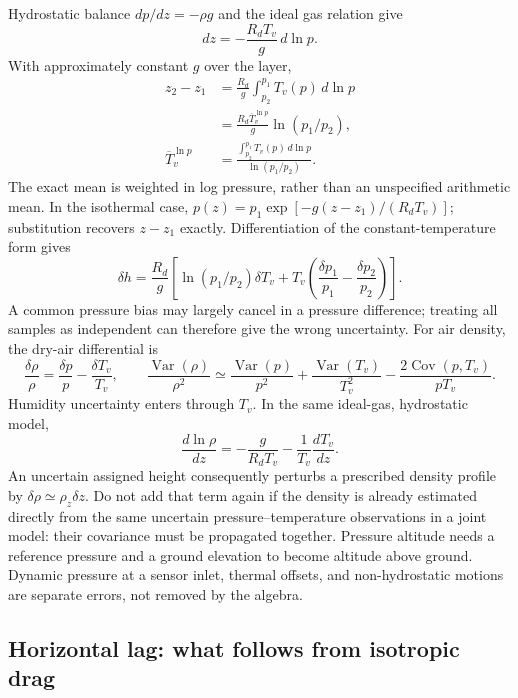 Hydrostatic balance $dp/dz=-\rho g$ and the ideal gas relation give
\begin{equation}
 dz=-\frac{R_dT_v}{g}\,d\ln p.
\end{equation}
With approximately constant $g$ over the layer,
\begin{align}
 z_2-z_1&=\frac{R_d}{g}\int_{p_2}^{p_1}T_v(p)\,d\ln p\\
 &=\frac{R_d\overline T_v^{\ln p}}{g}\ln(p_1/p_2),\\
 \overline T_v^{\ln p}&=
 \frac{\int_{p_2}^{p_1}T_v(p)\,d\ln p}{\ln(p_1/p_2)}.
\end{align}
The exact mean is weighted in log pressure, rather than an unspecified
arithmetic mean. In the isothermal case,
$p(z)=p_1\exp[-g(z-z_1)/(R_dT_v)]$; substitution recovers $z-z_1$
exactly. Differentiation of the constant-temperature form gives
\begin{equation}
 \delta h=\frac{R_d}{g}\left[
  \ln(p_1/p_2)\delta T_v+
  T_v\left(\frac{\delta p_1}{p_1}-\frac{\delta p_2}{p_2}\right)\right].
\end{equation}
A common pressure bias may largely cancel in a pressure difference; treating
all samples as independent can therefore give the wrong uncertainty.
For air density, the dry-air differential is
\begin{equation}
 \frac{\delta\rho}{\rho}=\frac{\delta p}{p}-\frac{\delta T_v}{T_v},
 \qquad
 \frac{\operatorname{Var}(\rho)}{\rho^2}\simeq
 \frac{\operatorname{Var}(p)}{p^2}
 +\frac{\operatorname{Var}(T_v)}{T_v^2}
 -\frac{2\operatorname{Cov}(p,T_v)}{pT_v}.
\end{equation}
Humidity uncertainty enters through $T_v$. In the same ideal-gas,
hydrostatic model,
\begin{equation}
 \frac{d\ln\rho}{dz}=-\frac{g}{R_dT_v}
                         -\frac{1}{T_v}\frac{dT_v}{dz}.
\end{equation}
An uncertain assigned height consequently perturbs a prescribed density
profile by $\delta\rho\simeq\rho_z\delta z$. Do not add that term again
if the density is already estimated directly from the same uncertain
pressure--temperature observations in a joint model: their covariance
must be propagated together.
Pressure altitude needs a reference pressure and a ground elevation to
become altitude above ground. Dynamic pressure at a sensor inlet, thermal
offsets, and non-hydrostatic motions are separate errors, not removed by
the algebra.

\subsection{Horizontal lag: what follows from isotropic drag}


